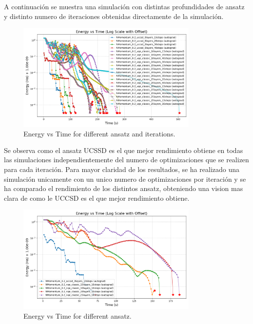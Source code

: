 A continuación se muestra una simulación con distintas profundidades de ansatz y distinto numero de iteraciones obtenidas directamente de la simulación.

\begin{figure}[H]
  \centering
  \includegraphics[width=0.8\textwidth]{data/Anzatz/results_ansatz_lyers_dif_iterations/energy_vs_time_log_offset.png}
  \caption{Energy vs Time for different ansatz and iterations.}
  \label{fig:ansatz_layers_iterations}
\end{figure}

Se observa como el ansatz UCSSD es el que mejor rendimiento obtiene en todas las simulaciones independientemente del numero de optimizaciones que se realizen para cada iteración. Para mayor claridad de los resultados, se ha realizado una simulación unicamente con un unico numero de optimizaciones por iteración y se ha comparado el rendimiento de los distintos ansatz, obteniendo una vision mas clara de como le UCCSD es el que mejor rendimiento obtiene.
\begin{figure}[H]
  \centering
  \includegraphics[width=0.8\textwidth]{data/Anzatz/results_ansatz_lyers/energy_vs_time_log_offset.png}
  \caption{Energy vs Time for different ansatz.}
  \label{fig:ansatz_layers}
\end{figure}

